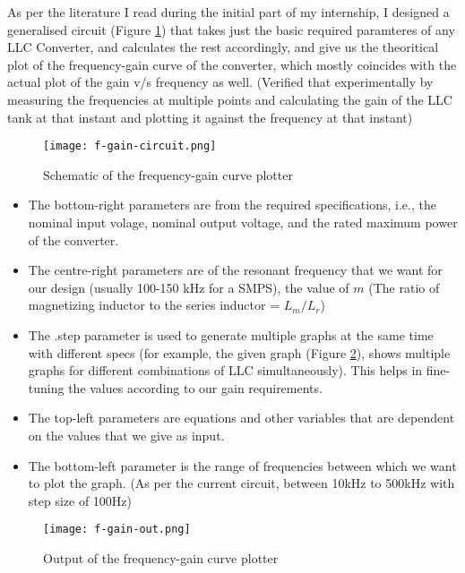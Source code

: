 As per the literature I read during the initial part of my internship, I designed a generalised circuit (Figure \ref*{fig:f-gain-circuit}) that takes just the basic required paramteres of any LLC Converter, and calculates the rest accordingly, and give us the theoritical plot of the frequency-gain curve of the converter, which mostly coincides with the actual plot of the gain v/s frequency as well. (Verified that experimentally by measuring the frequencies at multiple points and calculating the gain of the LLC tank at that instant and plotting it against the frequency at that instant)
\begin{figure}[H]
    \centering
    \texttt{[image: f-gain-circuit.png]}
    \caption{Schematic of the frequency-gain curve plotter}
    \label{fig:f-gain-circuit}
\end{figure}

\begin{itemize}
    \item The bottom-right parameters are from the required specifications, i.e., the nominal input volage, nominal output voltage, and the rated maximum power of the converter.
    \item The centre-right parameters are of the resonant frequency that we want for our design (usually 100-150 kHz for a SMPS), the value of $m$ (The ratio of magnetizing inductor to the series inductor = $L_m / L_r$)
    \item The .step parameter is used to generate multiple graphs at the same time with different specs (for example, the given graph (Figure \ref*{fig:f-gain-out}), shows multiple graphs for different combinations of LLC simultaneously). This helps in fine-tuning the values according to our gain requirements.
    \item The top-left parameters are equations and other variables that are dependent on the values that we give as input.
    \item The bottom-left parameter is the range of frequencies between which we want to plot the graph. (As per the current circuit, between 10kHz to 500kHz with step size of 100Hz)
\end{itemize}
\begin{figure}[H]
    \centering
    \texttt{[image: f-gain-out.png]}
    \caption{Output of the frequency-gain curve plotter}
    \label{fig:f-gain-out}
\end{figure}